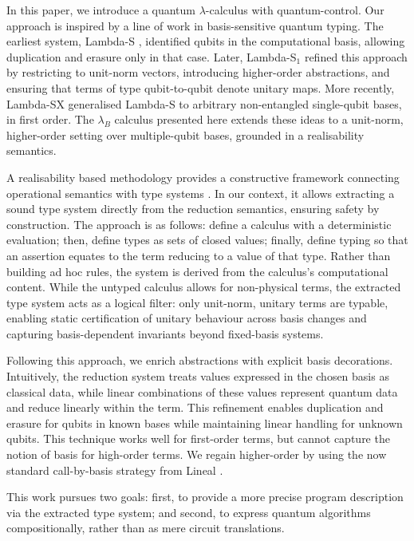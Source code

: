 \documentclass[a4paper,UKenglish,numberwithinsect,pdfa,anonymous]{lipics-v2021}
\theoremstyle{restatestyle}
\begin{document}
In this paper, we introduce a quantum $\lambda$-calculus with quantum-control.
Our approach is inspired by a line of work in basis-sensitive
quantum typing. The earliest system, Lambda-S \cite{DiazcaroDowekRinaldiBIO19},
identified qubits in the computational basis, allowing duplication and erasure
only in that case. Later, Lambda-S$_1$ \cite{DiazcaroGuillermoMiquelValironLICS19,
DiazCaroMalherbe2022} refined this approach by restricting to unit-norm vectors,
introducing higher-order abstractions, and ensuring that terms of type
qubit-to-qubit denote unitary maps. More recently, Lambda-SX 
\cite{DiazcaroMonzonAPLAS25} generalised Lambda-S to arbitrary non-entangled 
single-qubit bases, in first order. The $\lambda_B$ calculus presented here extends
these ideas to a unit-norm, higher-order setting over multiple-qubit bases,
grounded in a realisability semantics.

A realisability based methodology provides a constructive framework connecting
operational semantics with type systems \cite{KleeneJSL45}. In our context, 
it allows extracting a sound type system directly from the reduction semantics,
ensuring safety by construction. The approach is as follows: define a calculus
with a deterministic evaluation; then, define types as sets of closed values;
finally, define typing so that an assertion equates to the term reducing to a value of
that type. Rather than building ad hoc rules, the system is derived from the calculus's
computational content. While the untyped calculus allows for non-physical terms, the
extracted type system acts as a logical filter: only unit-norm, unitary terms
are typable, enabling static certification of unitary behaviour across basis
changes and capturing basis-dependent invariants beyond fixed-basis systems.

Following this approach, we enrich abstractions with explicit basis
decorations. Intuitively, the reduction system treats values expressed in the
chosen basis as classical data, while linear combinations of these values
represent quantum data and reduce linearly within the term. This refinement
enables duplication and erasure for qubits in known bases while maintaining
linear handling for unknown qubits. This technique works well for first-order
terms, but cannot capture the notion of basis for high-order terms. We
regain higher-order by using the now standard call-by-basis strategy from Lineal
\cite{ArrighiDowekLMCS17}.

This work pursues two goals: first, to provide a more precise program description
via the extracted type system; and second, to express quantum algorithms 
compositionally, rather than as mere circuit translations.
\end{document}
